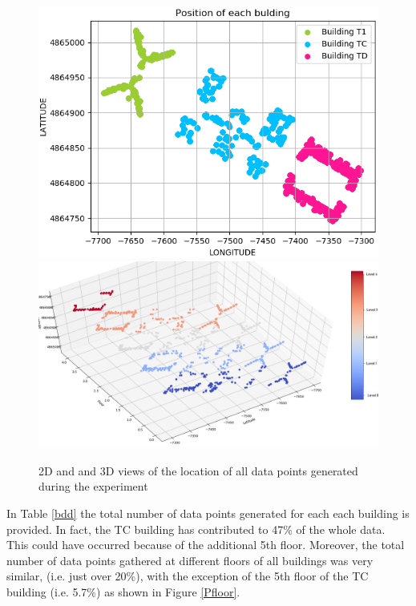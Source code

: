 \begin{figure}[!ht]
    \centering
    \includegraphics[width = 7 cm]{image/Chapters/Chapter6/LatLong.png}\hfill
    \includegraphics[width = 8 cm]{image/Chapters/Chapter6/LatLongFloor.png}
    \\[\smallskipamount]    
    \caption{ 2D and and 3D views of the location of all data points generated during the experiment}
    \label{nama}
\end{figure}

In Table \ref{bdd} the total number of data points generated for each each building is provided. In fact, the TC building has contributed to 47\% of the whole data.
This could have occurred because of the additional 5th floor. Moreover, the total number of data points gathered at different floors of all buildings was very similar, (i.e. just over 20\%), with the exception of the 5th floor of the TC building (i.e. 5.7\%) as shown in Figure \ref{Pfloor}. 




